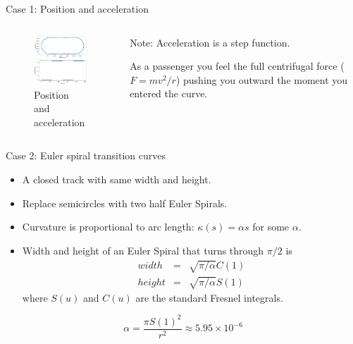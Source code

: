 \documentclass{beamer}
\begin{document}
\begin{frame}{Case 1: Position and acceleration}
	\begin{columns}
		\begin{column}{0.8\textwidth}			
			\begin{figure}
				\caption{Position and acceleration}
				\centering
				\includegraphics[width=70mm, scale=0.2]{circular_track.png}
			\end{figure}
		\end{column}
		\begin{column}{0.33\textwidth}
			Note: Acceleration is a step function. 
			
			As a passenger you feel the full centrifugal force ($F=mv^2/r$) pushing you outward the moment you entered the curve. 		
		\end{column}
	\end{columns}
\end{frame}


\begin{frame}{Case 2: Euler spiral transition curves}
	\begin{itemize}
		\item A closed track with same width and height. 
		\item Replace semicircles with two half Euler Spirals.
		\item Curvature is proportional to arc length: $\kappa(s) = \alpha s $ for some $\alpha$.
		\item Width and height of an Euler Spiral that turns through $\pi/2$ is 
		\begin{eqnarray*}
			width &=& \sqrt{\pi / \alpha} C(1) \\
			height &=& \sqrt{\pi /\alpha}S(1)
		\end{eqnarray*}
		where $S(u)$ and $C(u)$ are the standard Fresnel integrals.
	\end{itemize}
	\[
		\alpha = \frac{\pi S(1)^2}{r^2} \approx 5.95 \times 10 ^{-6}
	\]
	
\end{frame}
\end{document}

